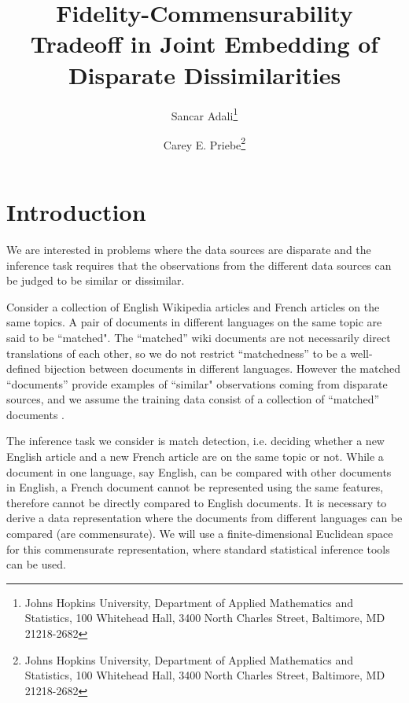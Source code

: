\documentclass[12pt]{article} %
\title{ Fidelity-Commensurability Tradeoff in Joint Embedding of Disparate Dissimilarities}
\author{Sancar Adali\thanks{Johns Hopkins University,
Department of Applied Mathematics and Statistics,
100 Whitehead Hall,
3400 North Charles Street,
Baltimore, MD 21218-2682} \and Carey E. Priebe\thanks{Johns Hopkins University,
Department of Applied Mathematics and Statistics,
100 Whitehead Hall,
3400 North Charles Street,
Baltimore, MD 21218-2682}
}
\begin{document}
\maketitle
\abstract{
}




\section{Introduction\label{sec:intro}}
  We are interested in problems where the data sources are disparate and the inference task requires that the observations from  the different data sources  can be judged to be similar or dissimilar.
	
	Consider a collection of  English Wikipedia articles  and   French articles on the same topics. A pair of documents in different languages on the same topic are said to be ``matched". The ``matched'' wiki documents are  not necessarily direct translations of each other, so  we do not restrict ``matchedness'' to be a well-defined bijection between documents in different languages.
	However the matched ``documents''  provide examples of  ``similar"  observations coming from disparate sources, and we assume the training data consist of  a collection of ``matched'' documents .
	
  The inference task we consider is match detection, i.e. deciding whether a new English article and a new French article are on the same topic or not. While  a document in one language, say English, can be compared with other documents in English, a  French document  cannot be represented using the same features, therefore cannot be directly compared to English documents.  It is necessary   to derive a data representation  where the  documents from different languages can be compared (are commensurate).  %
	We will use a finite-dimensional Euclidean space for  this commensurate representation, where standard  statistical inference tools can be used.
	
\end{document}
